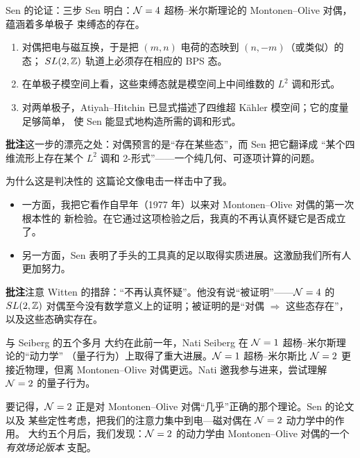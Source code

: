\begin{frame}{Sen 的论证：三步}
   Sen 明白：$\mathcal{N}=4$ 超杨--米尔斯理论的 Montonen--Olive 对偶，蕴涵着多单极子
  束缚态的存在。
  \begin{enumerate}
    \item 对偶把电与磁互换，于是把 $(m,n)$ 电荷的态映到 $(n,-m)$（或类似）的态；
      $SL(2,\mathbb{Z})$ 轨道上必须存在相应的 BPS 态。
    \item 在单极子模空间上看，这些束缚态就是模空间上中间维数的 $L^2$ 调和形式。
    \item 对两单极子，Atiyah--Hitchin 已显式描述了四维超 Kähler 模空间；它的度量足够简单，
      使 Sen 能显式地构造所需的调和形式。
  \end{enumerate}
  \begin{beizhu}
  \textbf{批注}\quad 这一步的漂亮之处：对偶预言的是“存在某些态”，而 Sen 把它翻译成
  “某个四维流形上存在某个 $L^2$ 调和 2-形式”——一个纯几何、可逐项计算的问题。
  \end{beizhu}
\end{frame}

\begin{frame}{为什么这是判决性的}
   这篇论文像电击一样击中了我。
  \begin{itemize}
    \item 一方面，我把它看作自早年（1977 年）以来对 Montonen--Olive 对偶的第一次根本性的
      新检验。在它通过这项检验之后，我真的不再认真怀疑它是否成立了。
    \item 另一方面，Sen 表明了手头的工具真的足以取得实质进展。这激励我们所有人更加努力。
  \end{itemize}
  \vspace{0.5em}
  \begin{beizhu}
  \textbf{批注}\quad 注意 Witten 的措辞：“不再认真怀疑”。他没有说“被证明”——$\mathcal{N}=4$ 的
  $SL(2,\mathbb{Z})$ 对偶至今没有数学意义上的证明；被证明的是“对偶 $\Rightarrow$ 这些态存在”，
  以及这些态确实存在。
  \end{beizhu}
\end{frame}

\begin{frame}{与 Seiberg 的五个多月}
   大约在此前一年，Nati Seiberg 在 $\mathcal{N}=1$ 超杨--米尔斯理论的“动力学”
  （量子行为）上取得了重大进展。$\mathcal{N}=1$ 超杨--米尔斯比 $\mathcal{N}=2$ 更接近物理，但离
  Montonen--Olive 对偶更远。Nati 邀我参与进来，尝试理解 $\mathcal{N}=2$ 的量子行为。
  \vspace{0.4em}

  要记得，$\mathcal{N}=2$ 正是对 Montonen--Olive 对偶“几乎”正确的那个理论。Sen 的论文以及
  某些定性考虑，把我们的注意力集中到电—磁对偶在 $\mathcal{N}=2$ 动力学中的作用。
  大约五个月后，我们发现：$\mathcal{N}=2$ 的动力学由 Montonen--Olive 对偶的一个
  \emph{有效场论版本} 支配。
\end{frame}

